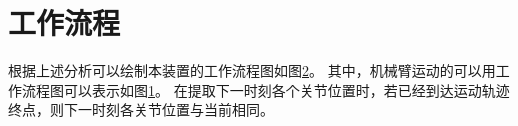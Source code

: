 \section{工作流程}

根据上述分析可以绘制本装置的工作流程图如图\ref{fig:work_flow}。
其中，机械臂运动的可以用工作流程图可以表示如图\ref{fig:robot_move}。
在提取下一时刻各个关节位置时，若已经到达运动轨迹终点，则下一时刻各关节位置与当前相同。

\begin{figure}[!htp]
    \centering
    \resizebox{\textwidth}{!}{}
    \label{fig:robot_move}
\end{figure}

\begin{figure}[!htp]
    \centering
    \resizebox{6cm}{!}{}
    \label{fig:work_flow}
\end{figure}

